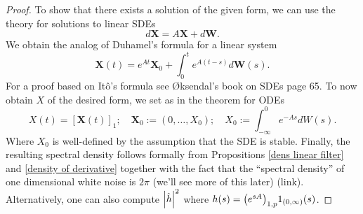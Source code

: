 \documentclass[12pt]{article}
\begin{document}
\begin{proof}
	To show that there exists a solution of the given form, we can use the  theory for solutions to linear SDEs
	\begin{equation*}
		d \mathbf{X}=A \mathbf{X} +d \mathbf{W} .
	\end{equation*}
	We obtain the analog of Duhamel's formula for a linear system
	\begin{equation*}
		\textbf{X}(t)= e^{At} \textbf{X}_0+\int_{0}^te^{A(t-s)} d \textbf{W}(s).
	\end{equation*}
	For a proof based on Itô's formula see Øksendal's book on SDEs \cite{oksendal2003stochastic} page 65. To now obtain $X$ of the desired form, we set as in the theorem for ODEs
	$$X(t)= [\textbf{X}(t)]_{1} ;\quad\textbf{X}_0:=(0,\ldots,X_0);\quad X_0:=\int_{-\infty}^0e^{-As} dW(s).$$ Where $X_0$ is well-defined by the assumption that the SDE is stable. Finally, the resulting spectral density follows formally from Propositions \ref{dens linear filter} and \ref{density of derivative} together with the fact that the ``spectral density'' of one dimensional white noise is $2\pi$ (we'll see more of this later) (link). Alternatively, one can also compute $\abs{\hat{h}}^2$ where
	$h(s)=\qty(e^{sA})_{1,p}1_{(0,\infty)}(s)$.
\end{proof}
\end{document}
